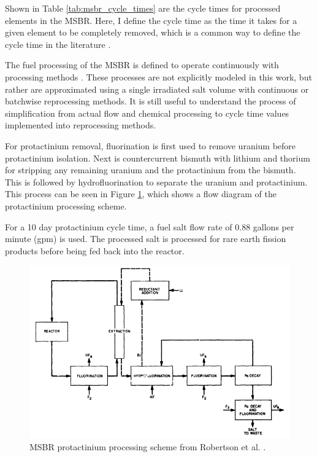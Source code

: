 
Shown in Table \ref{tab:msbr_cycle_times} are the cycle times for processed elements in the MSBR.
Here, I define the cycle time as the time it takes for a given element to be completely removed, which is a common way to define the cycle time in the literature \cite{betzler_molten_2017, rykhlevskii_modeling_2019, robertson_conceptual_1971}.

The fuel processing of the MSBR is defined to operate continuously with processing methods \cite{robertson_conceptual_1971}. These processes are not explicitly modeled in this work, but rather are approximated using a single irradiated salt volume with continuous or batchwise reprocessing methods. It is still useful to understand the process of simplification from actual flow and chemical processing to cycle time values implemented into reprocessing methods.

For protactinium removal, fluorination is first used to remove uranium before protactinium isolation. Next is countercurrent bismuth with lithium and thorium for stripping any remaining uranium and the protactinium from the bismuth. This is followed by hydrofluorination to separate the uranium and protactinium. This process can be seen in Figure \ref{fig:msbr_pa}, which shows a flow diagram of the protactinium processing scheme.

For a 10 day protactinium cycle time, a fuel salt flow rate of 0.88 gallons per minute (gpm) is used. The processed salt is processed for rare earth fission products before being fed back into the reactor. 
\begin{figure}[H]
  \centering
  \includegraphics[scale=0.55]{images/msbr_pa_robertson.PNG}
  \caption{MSBR protactinium processing scheme from Robertson et al. \cite{robertson_conceptual_1971}.}
   \label{fig:msbr_pa}
\end{figure}

